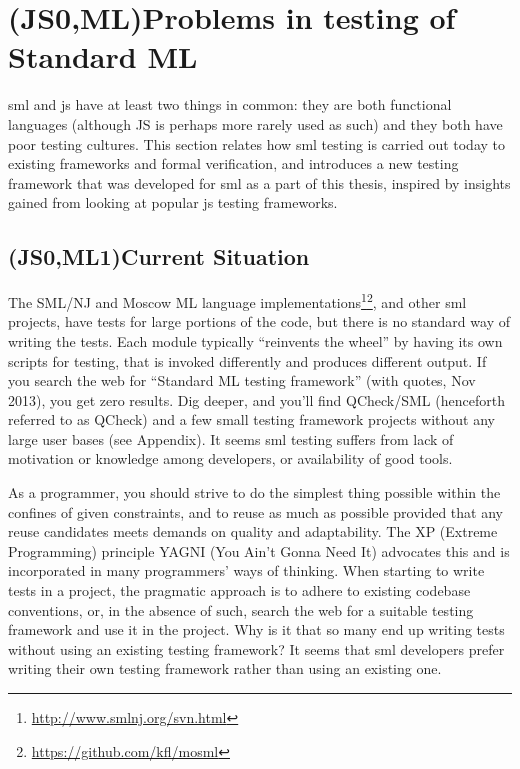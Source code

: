 \documentclass[11pt]{article}
\begin{document}
\section{(JS0,ML)Problems in testing of Standard ML}

\gls{sml} and \gls{js} have at least two things in common: they are both functional languages (although JS is perhaps more rarely used as such) and they both have poor testing cultures. This section relates how \gls{sml} testing is carried out today to existing frameworks and formal verification, and introduces a new testing framework that was developed for \gls{sml} as a part of this thesis, inspired by insights gained from looking at popular \gls{js} testing frameworks.

\subsection{(JS0,ML1)Current Situation}

The SML/NJ and Moscow ML language implementations\footnote{\url{http://www.smlnj.org/svn.html}}\footnote{\url{https://github.com/kfl/mosml}}, and other \gls{sml} projects, have tests for large portions of the code, but there is no standard way of writing the tests. Each module typically ``reinvents the wheel'' by having its own scripts for testing, that is invoked differently and produces different output. If you search the web for ``Standard ML testing framework'' (with quotes, Nov 2013), you get zero results. Dig deeper, and you'll find QCheck/SML (henceforth referred to as QCheck) and a few small testing framework projects without any large user bases (see Appendix). It seems \gls{sml} testing suffers from lack of motivation or knowledge among developers, or availability of good tools. %

As a programmer, you should strive to do the simplest thing possible within the confines of given constraints, and to reuse as much as possible provided that any reuse candidates meets demands on quality and adaptability. The XP (Extreme Programming) principle YAGNI (You Ain't Gonna Need It) advocates this and is incorporated in many programmers' ways of thinking. When starting to write tests in a project, the pragmatic approach is to adhere to existing codebase conventions, or, in the absence of such, search the web for a suitable testing framework and use it in the project. Why is it that so many end up writing tests without using an existing testing framework? It seems that \gls{sml} developers prefer writing their own testing framework rather than using an existing one.
\end{document}
